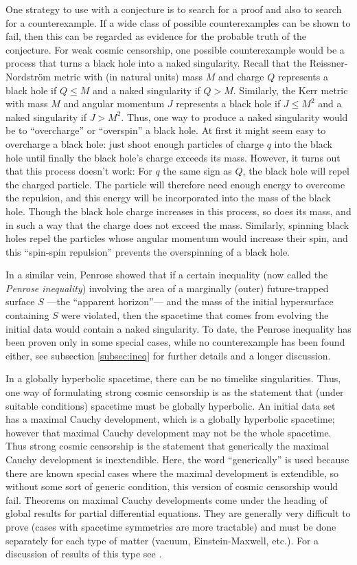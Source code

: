 \documentclass[12pt]{iopart}
\begin{document}
One strategy to use with a conjecture is to search for a proof and also to search for a counterexample.  If a wide class of possible counterexamples can be shown to fail, then this can be regarded as evidence for the probable truth of the conjecture.  For weak cosmic censorship, one possible counterexample would be a process that turns a black hole into a naked singularity.  Recall that the Reissner-Nordstr\"om metric with (in natural units) mass $M$ and charge $Q$ represents a black hole if $Q \le M$ and a naked singularity if $Q > M$.  Similarly, the Kerr metric with mass $M$ and angular momentum $J$ represents a black hole if $J \le {M^2}$ and a naked singularity if $J > {M^2}$.  Thus, one way to produce a naked singularity would be to ``overcharge'' or ``overspin'' a black hole.  At first it might seem easy to overcharge a black hole: just shoot enough particles of charge $q$ into the black hole until finally the black hole's charge exceeds its mass.  However, it turns out that this process doesn't work: For $q$ the same sign as $Q$, the black hole will repel the charged particle.  The particle will therefore need enough energy to overcome the repulsion, and this energy will be incorporated into the mass of the black hole.  Though the black hole charge increases in this process, so does its mass, and in such a way that the charge does not exceed the mass.  Similarly, spinning black holes repel the particles whose angular momentum would increase their spin, and this ``spin-spin repulsion'' prevents the overspinning of a black hole.  

In a similar vein, Penrose showed \cite{PI} that if a certain inequality (now called the {\em Penrose inequality}) involving the area of a marginally (outer) future-trapped surface $S$ ---the ``apparent horizon''--- and the mass of the initial hypersurface containing $S$ were violated, then the spacetime that comes from evolving the initial data would contain a naked singularity. To date, the Penrose inequality has been proven only in some special cases, while no counterexample has been found either, see subsection \ref{subsec:ineq} for further details and a longer discussion.

In a globally hyperbolic spacetime, there can be no timelike singularities.  Thus, one way of formulating strong cosmic censorship is as the statement that (under suitable conditions) spacetime must be globally hyperbolic.  An initial data set has a maximal Cauchy development, which is a globally hyperbolic spacetime; however that maximal Cauchy development may not be the whole spacetime.  Thus strong cosmic censorship is the statement that generically the maximal Cauchy development is inextendible.  Here, the word ``generically'' is used because there are known special cases where the maximal development is
extendible, so without some sort of generic condition, this version of cosmic censorship would fail.  Theorems on maximal Cauchy developments come under the heading of global results for partial differential equations.  They are generally very difficult to prove (cases with spacetime symmetries are more tractable) and must be done separately for each type of matter (vacuum, Einstein-Maxwell, etc.).  For a discussion of results of this type see \cite{Ringstrom}.
\end{document}
